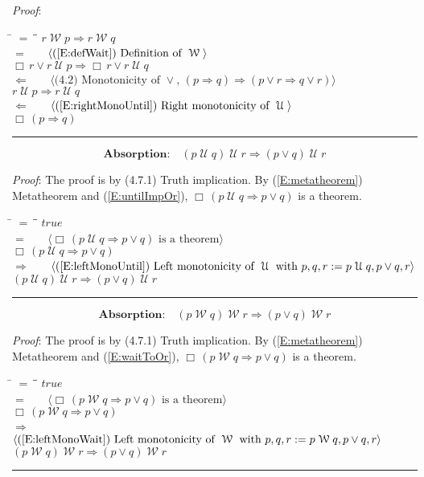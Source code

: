 \documentclass[12pt, fleqn, leqno]{article}
\newcommand{\lgap}{2pt}                             %
\newcommand{\mymathindent}{24pt}                    %
\newcommand{\impl}{\ensuremath{\Rightarrow}}        %
\newcommand{\foll}{\ensuremath{\Leftarrow}}         %
\newcommand{\Until}{\;\mathcal{U}\;}
\newcommand{\Wait}{\;\mathcal{W}\;}
\newcommand{\Always}{\Box\,}
\newcommand{\myqed}{\rule[-.23ex]{1.2ex}{2.0ex}}
\newcommand{\myqedtab}{\hspace{384pt}}              %
\newcommand{\Gll} {\langle}                         %
\newcommand{\Ggg} {\rangle}                         %
\newcommand{\Hint}[1]     {\ \ \ $\Gll              \mbox{#1} \Ggg$ }   %
\begin{document}
\emph{Proof}:
\begin{tabbing}
\hspace{\mymathindent} \= $= \;$ \= \myqedtab \= \kill
  \> \>   $r \Wait p \impl r \Wait q$\\[\lgap]
  \> $=$ \> \Hint{(\ref{E:defWait}) Definition of $\Wait$} \\[\lgap]
  \> \>   $\Always r \lor r \Until p \impl \Always r \lor r \Until q$\\[\lgap]
  \> $\foll$  \>  \Hint{(4.2) Monotonicity of $\lor$, $(p\impl q)\impl (p\lor r \impl q\lor r)$}\\[\lgap]
  \> \>   $r \Until p \impl r \Until q$\\[\lgap]
  \> $\foll$  \>  \Hint{(\ref{E:rightMonoUntil}) Right monotonicity of $\Until$}\\[\lgap]
  \> \>   $\Always (p \impl q)$ \quad \myqed
\end{tabbing}

\begin{equation}\label{E:untilImpAbsR}
\textbf{Absorption:}\quad (p \Until q) \Until r \impl (p \lor q) \Until r
\end{equation}

\emph{Proof}: The proof is by (4.7.1) Truth implication.
By (\ref{E:metatheorem}) Metatheorem and (\ref{E:untilImpOr}), $\Always (p\Until q\impl p\lor q)$ is a theorem.
\begin{tabbing}
\hspace{\mymathindent} \= $= \;$ \= \myqedtab \= \kill
  \> \>   $true$\\[\lgap]
  \> $=$ \> \Hint{$\Always (p\Until q\impl p\lor q)$ is a theorem} \\[\lgap]
  \> \>   $\Always (p\Until q\impl p\lor q)$\\[\lgap]
  \> $\impl$  \>  \Hint{(\ref{E:leftMonoUntil}) Left monotonicity of $\Until$ with $p,q,r := p\Until q, p\lor q, r$}\\[\lgap]
  \> \>   $(p \Until q) \Until r \impl (p \lor q) \Until r$ \quad \myqed
\end{tabbing}

\begin{equation}\label{E:waitImpAbsR}
\textbf{Absorption:}\quad (p \Wait q) \Wait r \impl (p \lor q) \Wait r
\end{equation}

\emph{Proof}: The proof is by (4.7.1) Truth implication.
By (\ref{E:metatheorem}) Metatheorem and (\ref{E:waitToOr}), $\Always (p\Wait q\impl p\lor q)$ is a theorem.
\begin{tabbing}
\hspace{\mymathindent} \= $= \;$ \= \myqedtab \= \kill
  \> \>   $true$\\[\lgap]
  \> $=$ \> \Hint{$\Always (p\Wait q\impl p\lor q)$ is a theorem} \\[\lgap]
  \> \>   $\Always (p\Wait q\impl p\lor q)$\\[\lgap]
  \> $\impl$  \>  \Hint{(\ref{E:leftMonoWait}) Left monotonicity of $\Wait$ with $p,q,r := p\Wait q, p\lor q, r$}\\[\lgap]
  \> \>   $(p \Wait q) \Wait r \impl (p \lor q) \Wait r$ \quad \myqed
\end{tabbing}
\end{document}
